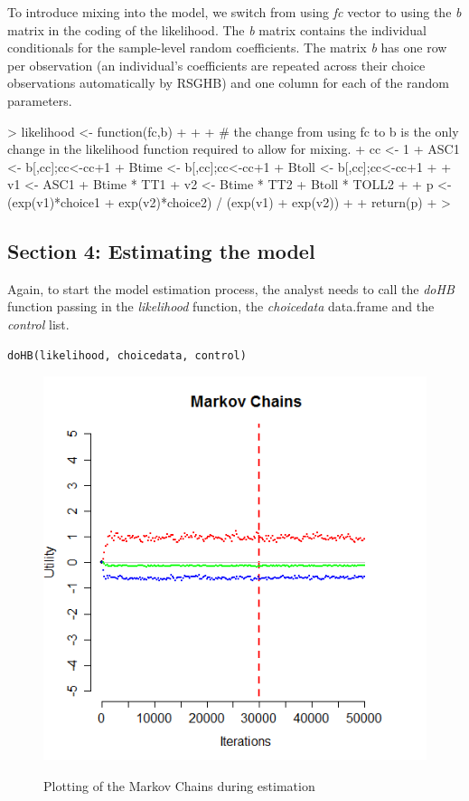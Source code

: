 \documentclass{article}
\begin{document}
To introduce mixing into the model, we switch from using \emph{fc} vector to using the \emph{b} matrix in the coding of the likelihood. The \emph{b} matrix contains the individual conditionals for the sample-level random coefficients. The matrix \emph{b} has one row per observation (an individual's coefficients are repeated across their choice observations automatically by RSGHB) and one column for each of the random parameters.

\begin{Schunk}
\begin{Sinput}
> likelihood <- function(fc,b)
+ {  
+      
+      # the change from using fc to b is the only change in the likelihood function required to allow for mixing.
+      cc     <- 1
+      ASC1   <- b[,cc];cc<-cc+1
+      Btime  <- b[,cc];cc<-cc+1
+      Btoll  <- b[,cc];cc<-cc+1  
+   
+      v1 <- ASC1       + Btime * TT1                   
+      v2 <-              Btime * TT2 + Btoll * TOLL2   
+  
+      p  <- (exp(v1)*choice1 + exp(v2)*choice2) / (exp(v1) + exp(v2))
+      
+      return(p)
+ }
> 
\end{Sinput}
\end{Schunk}

\subsection*{Section 4: Estimating the model}

Again, to start the model estimation process, the analyst needs to call the \emph{doHB} function passing in the \emph{likelihood} function, the \emph{choicedata} data.frame and the \emph{control} list. 

\begin{verbatim}
doHB(likelihood, choicedata, control)
\end{verbatim}

\begin{figure}
\caption{Plotting of the Markov Chains during estimation}
\includegraphics[scale=0.50]{MNL_markovChains2.png}
\label{MarkovChain2}
\end{figure}
\end{document}
